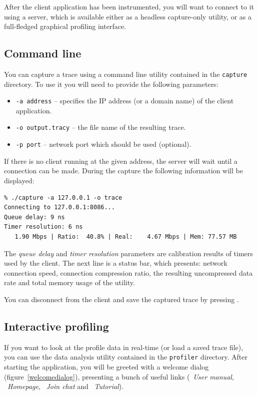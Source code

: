 \documentclass[hidelinks,titlepage,a4paper]{article}
\begin{document}
After the client application has been instrumented, you will want to connect to it using a server, which is available either as a headless capture-only utility, or as a full-fledged graphical profiling interface.

\subsection{Command line}

You can capture a trace using a command line utility contained in the \texttt{capture} directory. To use it you will need to provide the following parameters:

\begin{itemize}
\item \texttt{-a address} -- specifies the IP address (or a domain name) of the client application.
\item \texttt{-o output.tracy} -- the file name of the resulting trace.
\item \texttt{-p port} -- network port which should be used (optional).
\end{itemize}

If there is no client running at the given address, the server will wait until a connection can be made. During the capture the following information will be displayed:

\begin{verbatim}
% ./capture -a 127.0.0.1 -o trace
Connecting to 127.0.0.1:8086...
Queue delay: 9 ns
Timer resolution: 6 ns
   1.90 Mbps | Ratio:  40.8% | Real:    4.67 Mbps | Mem: 77.57 MB
\end{verbatim}

The \emph{queue delay} and \emph{timer resolution} parameters are calibration results of timers used by the client. The next line is a status bar, which presents: network connection speed, connection compression ratio, the resulting uncompressed data rate and total memory usage of the utility.

You can disconnect from the client and save the captured trace by pressing .

\subsection{Interactive profiling}
\label{interactiveprofiling}

If you want to look at the profile data in real-time (or load a saved trace file), you can use the data analysis utility contained in the \texttt{profiler} directory. After starting the application, you will be greeted with a welcome dialog (figure~\ref{welcomedialog}), presenting a bunch of useful links (\faBook{}~\emph{User manual}, \faGlobeAmericas{}~\emph{Homepage}, \faComment~\emph{Join chat} and \faVideo{}~\emph{Tutorial}).
\end{document}
